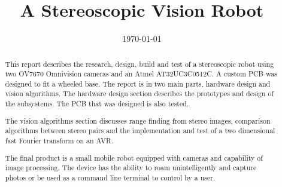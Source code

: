 \documentclass{ecsproject}      %
\newcommand{\inote}[1] {\todo[inline]{#1}}
\begin{document}
        
\frontmatter
\title      {A Stereoscopic Vision Robot}
\addresses  {\groupname\\\deptname\\\univname}
\date       {\today}
\subject    {}
\keywords   {}
\maketitle
\inote{Turn off iNotes!}
\begin{abstract}
This report describes the research, design, build and test of a stereoscopic robot using two OV7670 Omnivision cameras and an Atmel AT32UC3C0512C. A custom PCB was designed to fit a wheeled base. The report is in two main parts, hardware design and vision algorithms. The hardware design section describes the prototypes and design of the subsystems. The PCB that was designed is also tested.

The vision algorithms section discusses range finding from stereo images, comparison algorithms between stereo pairs and the implementation and test of a two dimensional fast Fourier transform on an AVR. 

The final product is a small mobile robot equipped with cameras and capability of image processing. The device has the ability to roam unintelligently and capture photos or be used as a command line terminal to control by a user.
\end{abstract}
\tableofcontents
\listoffigures
\listoftables
\lstlistoflistings
\end{document}
